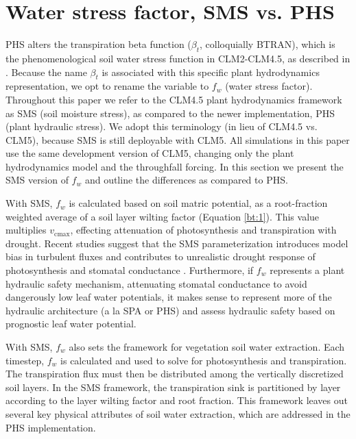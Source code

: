 \documentclass[draft,linenumbers]{agujournal}
\begin{document}

\section{Water stress factor, SMS vs. PHS}
\label{sect:btran}
    PHS alters the transpiration beta function ($\beta_t$, colloquially BTRAN), 
    which is the phenomenological soil water stress function in CLM2-CLM4.5, as described in \citet{oleson2013}.
    Because the name $\beta_t$ is associated with this specific plant hydrodynamics representation, we opt to rename the variable to $f_w$ (water stress factor).
    Throughout this paper we refer to the CLM4.5 plant hydrodynamics framework as SMS (soil moisture stress), 
    as compared to the newer implementation, PHS (plant hydraulic stress).
    We adopt this terminology (in lieu of CLM4.5 vs. CLM5), because SMS is still deployable with CLM5. 
    All simulations in this paper use the same development version of CLM5, changing only the plant hydrodynamics model and the throughfall forcing.
    In this section we present the SMS version of $f_w$ and outline the differences as compared to PHS.
    
    With SMS, $f_w$ is calculated based on soil matric potential, as a root-fraction weighted average of a soil layer wilting factor (Equation \ref{bt:1}).
    This value multiplies $v_{\text{cmax}}$, effecting attenuation of photosynthesis and transpiration with drought.
    Recent studies suggest that the SMS parameterization introduces model bias in turbulent fluxes \citep{bonan2014}
    and contributes to unrealistic drought response of photosynthesis and stomatal conductance \citep{powell2013}.
    Furthermore, if $f_w$ represents a plant hydraulic safety mechanism, attenuating stomatal conductance to avoid
    dangerously low leaf water potentials, it makes sense to represent more of the hydraulic architecture (a la SPA or PHS)
    and assess hydraulic safety based on prognostic leaf water potential.
    
    With SMS, $f_w$ also sets the framework for vegetation soil water extraction. 
    Each timestep, $f_w$ is calculated and used to solve for photosynthesis and transpiration.
    The transpiration flux must then be distributed among the vertically discretized soil layers.
    In the SMS framework, the transpiration sink is partitioned by layer according to the layer wilting factor and root fraction.
    This framework leaves out several key physical attributes of soil water extraction, which are addressed in the PHS implementation.
    
\end{document}
